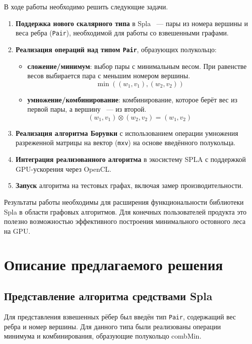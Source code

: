 \documentclass[a4paper]{article}
\begin{document}
В ходе работы необходимо решить следующие задачи.

\begin{enumerate}
    \item \textbf{Поддержка нового скалярного типа} в Spla ~--- пары из номера вершины и веса ребра (\texttt{Pair}), необходимой для работы со взвешенными графами.
    
    \item \textbf{Реализация операций над типом \texttt{Pair}}, образующих полукольцо:
    \begin{itemize}
        \item[$\oplus$] \textbf{сложение/минимум}: выбор пары с минимальным весом. При равенстве весов выбирается пара с меньшим номером вершины.
        \[
        \min((w_1, v_1), (w_2, v_2))
        \]
        \item[$\otimes$] \textbf{умножение/комбинирование}: комбинирование, которое берёт вес из первой пары, а вершину ~--- из второй.
        \[
        (w_1, v_1) \otimes (w_2, v_2) = (w_1, v_2)
        \]
    \end{itemize}
    
    \item \textbf{Реализация алгоритма Борувки} с использованием операции умножения разреженной матрицы на вектор (\texttt{mxv}) на основе введённого полукольца.
    
    \item \textbf{Интеграция реализованного алгоритма} в экосистему SPLA с поддержкой GPU-ускорения через OpenCL.
    
    \item \textbf{Запуск} алгоритма на тестовых графах, включая замер производительности.
\end{enumerate}

Результаты работы необходимы для расширения функциональности библиотеки Spla в области графовых алгоритмов. Для конечных пользователей продукта это полезно возможностью эффективного построения минимального остовного леса на GPU. 

\section{Описание предлагаемого решения}
\subsection{Представление алгоритма средствами Spla}
Для представления взвешенных рёбер был введён тип \texttt{Pair}, содержащий вес ребра и номер вершины. Для данного типа были реализованы операции минимума и комбинирования, образующие полукольцо combMin.
\end{document}
